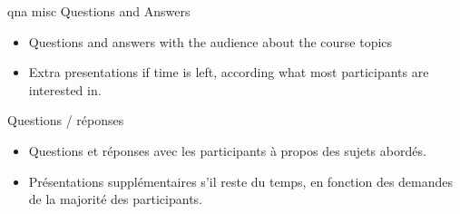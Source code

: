 {qna}
{misc}
{Questions and Answers}
{
  \begin{itemize}
  \item Questions and answers with the audience about the course topics
  \item Extra presentations if time is left, according what most
        participants are interested in.
  \end{itemize}
}
{Questions / réponses}
{
  \begin{itemize}
  \item Questions et réponses avec les participants à propos des sujets abordés.
  \item Présentations supplémentaires s'il reste du temps, en fonction des demandes
        de la majorité des participants.
  \end{itemize}
}


